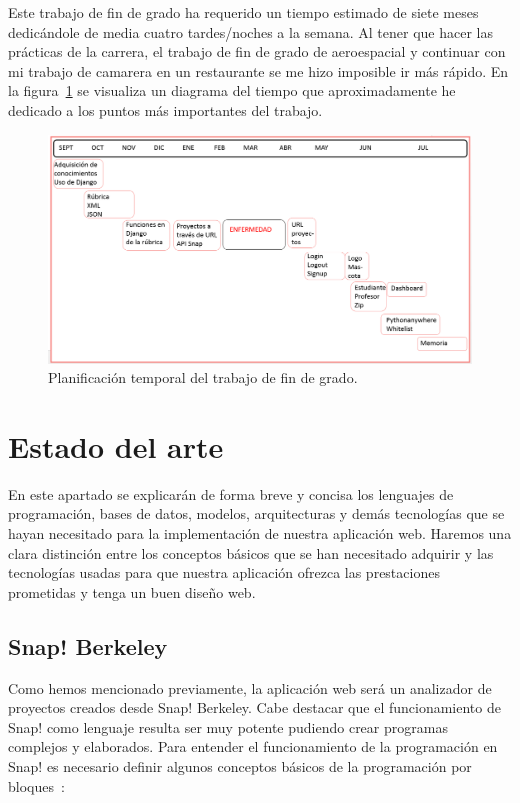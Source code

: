 \documentclass[a4paper, 12pt]{book}
\begin{document}
Este trabajo de fin de grado ha requerido un tiempo estimado de siete meses dedicándole de media cuatro tardes/noches a la semana. Al tener que hacer las prácticas de la carrera, el trabajo de fin de grado de aeroespacial y continuar con mi trabajo de camarera en un restaurante se me hizo imposible ir más rápido. En la figura~\ref{figura:tiempo} se visualiza un diagrama del tiempo que aproximadamente he dedicado a los puntos más importantes del trabajo. 

\begin{figure}[h]
\centering
\includegraphics[scale=0.45]{img/tiempo.PNG}
\caption{Planificación temporal del trabajo de fin de grado.}
\label{figura:tiempo}
\end{figure}





\cleardoublepage
\chapter{Estado del arte}
\label{chap:estado}

En este apartado se explicarán de forma breve y concisa los lenguajes de programación, bases de datos, modelos, arquitecturas y demás tecnologías que se hayan necesitado para la implementación de nuestra aplicación web. Haremos una clara distinción entre los conceptos básicos que se han necesitado adquirir y las tecnologías usadas para que nuestra aplicación ofrezca las prestaciones prometidas y tenga un buen diseño web.

\section{Snap! Berkeley}
Como hemos mencionado previamente, la aplicación web será un analizador de proyectos creados desde Snap! Berkeley. Cabe destacar que el funcionamiento de Snap! como lenguaje resulta ser muy potente pudiendo crear programas complejos y elaborados. Para entender el funcionamiento de la programación en Snap! es necesario definir algunos conceptos básicos de la programación por bloques~\cite{harvey2017snap}:
\end{document}
